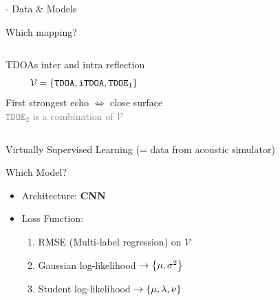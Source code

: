 \begin{frame}{\lantern - Data \& Models}
\begin{block}{Which mapping?}
\begin{columns}[T,onlytextwidth]

            \centering
            TDOAs inter and intra reflection
            \begin{equation*}
                \mathcal{V} = \kbrace{\mathtt{TDOA}, \mathtt{iTDOA}, \mathtt{TDOE}_1}
        \end{equation*}
        \textcolor{myred}{First strongest echo $\Leftrightarrow$ close surface}
        \\\textcolor{gray}{\small $\mathtt{TDOE}_2$ is a combination of $\mathcal{V}$}
        \end{columns}
    \end{block}

    Virtually Supervised Learning (= data from acoustic simulator)

    \begin{block}{Which Model?}
        \begin{itemize}
            \item Architecture: \textbf{CNN}~{\small\cite{chakrabarty2017broadband,nguyen2018autonomous}}
            \item Loss Function:
            \begin{enumerate}
                \item RMSE (Multi-label regression) on $\mathcal{V}$
                \item Gaussian log-likelihood $\to \kbrace{\mu, \sigma^2}$\hspace{.8em}
                \item Student log-likelihood $\to \kbrace{\mu, \lambda, \nu}$
        \end{enumerate}
        \end{itemize}

    \end{block}


\end{frame}


